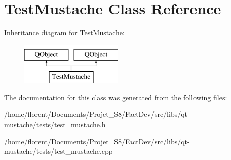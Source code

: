 \hypertarget{classTestMustache}{\section{Test\-Mustache Class Reference}
\label{classTestMustache}
}
Inheritance diagram for Test\-Mustache\-:\begin{figure}[H]
\begin{center}
\leavevmode
\includegraphics[height=2.000000cm]{de/d63/classTestMustache}
\end{center}
\end{figure}


The documentation for this class was generated from the following files\-:\begin{DoxyCompactItemize}
\item 
/home/florent/\-Documents/\-Projet\-\_\-\-S8/\-Fact\-Dev/src/libs/qt-\/mustache/tests/test\-\_\-mustache.\-h\item 
/home/florent/\-Documents/\-Projet\-\_\-\-S8/\-Fact\-Dev/src/libs/qt-\/mustache/tests/test\-\_\-mustache.\-cpp\end{DoxyCompactItemize}
